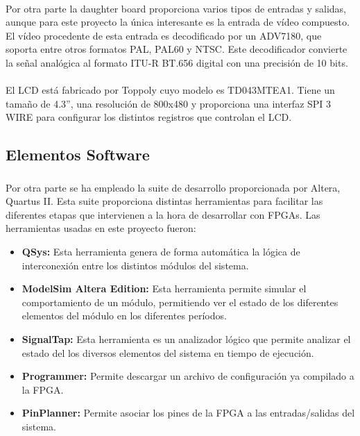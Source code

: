 \documentclass[a4paper,12pt,titlepage,final]{book}
\begin{document}
\paragraph{}
Por otra parte la daughter board proporciona varios tipos de entradas y salidas, aunque para este proyecto la única interesante es la entrada de vídeo compuesto. El vídeo procedente de esta entrada es decodificado por un ADV7180, que soporta entre otros formatos PAL, PAL60 y NTSC. Este decodificador convierte  la señal analógica al formato ITU-R BT.656 digital con una precisión de 10 bits.

\paragraph{}
El LCD está fabricado por Toppoly cuyo modelo es TD043MTEA1. Tiene un tamaño de
4.3”, una resolución de 800x480 y proporciona una interfaz SPI 3 WIRE para
configurar los distintos registros que controlan el LCD.

\subsection{Elementos Software}
\subsubsection*{}

\paragraph{}
Por otra parte se ha empleado la suite de desarrollo proporcionada por Altera,
Quartus II. Esta suite proporciona distintas herramientas para facilitar las
diferentes etapas que intervienen a la hora de desarrollar con FPGAs. Las
herramientas usadas en este proyecto fueron:

\begin{itemize}
\item \textbf{QSys:} Esta herramienta genera de forma automática la lógica de interconexión
entre los distintos módulos del sistema.

\item \textbf{ModelSim Altera Edition:} Esta herramienta permite simular el comportamiento de
un módulo, permitiendo ver el estado de los diferentes elementos del módulo en
los diferentes períodos.

\item \textbf{SignalTap:} Esta herramienta es un analizador lógico que permite analizar el
estado del los diversos elementos del sistema en tiempo de ejecución.

\item \textbf{Programmer:} Permite descargar un archivo de configuración ya compilado a la FPGA.

\item \textbf{PinPlanner:} Permite asociar los pines de la FPGA a las entradas/salidas del sistema.
\end{itemize}
\end{document}
